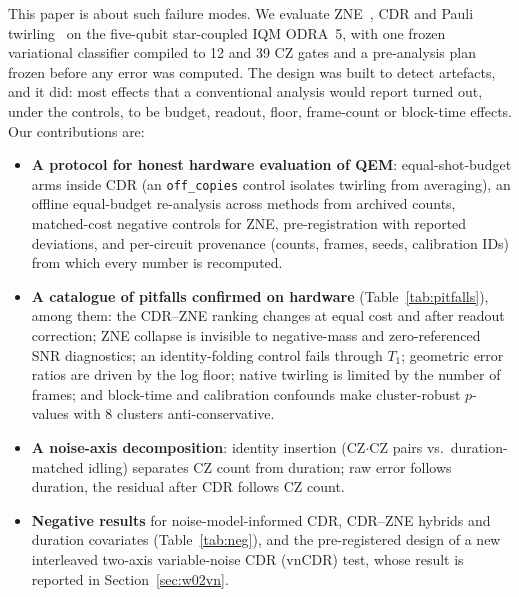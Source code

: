 \documentclass[conference]{IEEEtran}
\newcommand{\arm}[1]{\texttt{#1}}
\begin{document}
This paper is about such failure modes. We evaluate ZNE~\cite{temme2017,giurgica2020}, CDR
\cite{czarnik2021} and Pauli twirling~\cite{wallman2016,hashim2021} on the five-qubit
star-coupled IQM ODRA~5, with one frozen variational classifier compiled to 12 and 39 CZ
gates and a pre-analysis plan frozen before any error was computed. The design was built to
detect artefacts, and it did: most effects that a conventional analysis would report turned
out, under the controls, to be budget, readout, floor, frame-count or block-time effects.
Our contributions are:
\begin{itemize}
  \item \textbf{A protocol for honest hardware evaluation of QEM}: equal-shot-budget arms
  inside CDR (an \arm{off\_copies} control isolates twirling from averaging), an offline
  equal-budget re-analysis across methods from archived counts, matched-cost negative
  controls for ZNE, pre-registration with reported deviations, and per-circuit provenance
  (counts, frames, seeds, calibration IDs) from which every number is recomputed.
  \item \textbf{A catalogue of pitfalls confirmed on hardware} (Table~\ref{tab:pitfalls}),
  among them: the CDR--ZNE ranking changes at equal cost and after readout correction; ZNE
  collapse is invisible to negative-mass and zero-referenced SNR diagnostics; an identity-folding
  control fails through $T_1$; geometric error ratios are driven by the log floor; native
  twirling is limited by the number of frames; and block-time and calibration confounds make
  cluster-robust $p$-values with 8 clusters anti-conservative.
  \item \textbf{A noise-axis decomposition}: identity insertion (CZ$\cdot$CZ pairs vs.\
  duration-matched idling) separates CZ count from duration; raw error follows duration,
  the residual after CDR follows CZ count.
  \item \textbf{Negative results} for noise-model-informed CDR, CDR--ZNE hybrids and duration
  covariates (Table~\ref{tab:neg}), and the pre-registered design of a new interleaved
  two-axis variable-noise CDR (vnCDR) test, whose result is reported in
  Section~\ref{sec:w02vn}.
\end{itemize}
\end{document}
